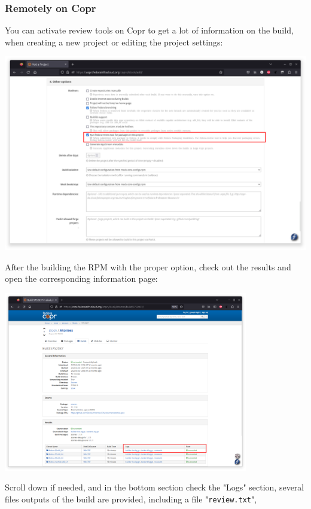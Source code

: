 \subsubsection{Remotely on Copr}
\label{rcopr}

You can activate review tools on Copr to get a lot of information on the build, when creating a new project or editing the project settings:
\begin{center}
\includegraphics[width=1.0\textwidth,keepaspectratio=true,draft=\ddst]{img/rpms/copr-review.eps}
\end{center}
\newpage
\noindent After the building the RPM with the proper option, check out the results and open the corresponding information page: \\
\begin{center}
\includegraphics[width=0.8\textwidth,keepaspectratio=true,draft=\ddst]{img/rpms/copr-rev-res.eps}
\end{center}
Scroll down if needed, and in the bottom section check the "Logs" section, several files outputs of the build are provided, including a file "\texttt{review.txt}", 
